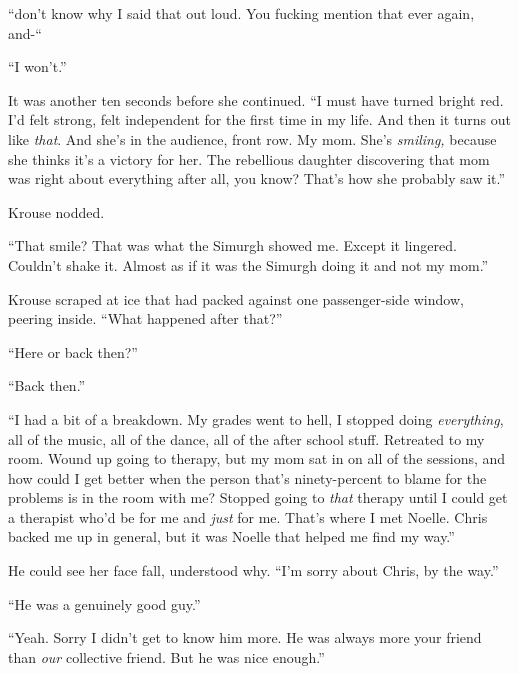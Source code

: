 ``\ldotsI don't know why I said that out loud.  You fucking mention that ever again, and-``



``I won't.''



It was another ten seconds before she continued.  ``I must have turned bright red.  I'd felt strong, felt independent for the first time in my life.  And then it turns out like \emph{that}.  And she's in the audience, front row.  My mom.  She's \emph{smiling, }because she thinks it's a victory for her.  The rebellious daughter discovering that mom was right about everything after all, you know?  That's how she probably saw it.''



Krouse nodded.



``That smile?  That was what the Simurgh showed me.  Except it lingered.  Couldn't shake it.  Almost as if it was the Simurgh doing it and not my mom.''



Krouse scraped at ice that had packed against one passenger-side window, peering inside.  ``What happened after that?''



``Here or back then?''



``Back then.''



``I had a bit of a breakdown.  My grades went to hell, I stopped doing \emph{everything}, all of the music, all of the dance, all of the after school stuff.  Retreated to my room.  Wound up going to therapy, but my mom sat in on all of the sessions, and how could I get better when the person that's ninety-percent to blame for the problems is in the room with me?  Stopped going to \emph{that} therapy until I could get a therapist who'd be for me and \emph{just} for me.  That's where I met Noelle.  Chris backed me up in general, but it was Noelle that helped me find my way.''



He could see her face fall, understood why.  ``I'm sorry about Chris, by the way.''



``He was a genuinely good guy.''



``Yeah.  Sorry I didn't get to know him more.  He was always more your friend than \emph{our} collective friend.  But he was nice enough.''



